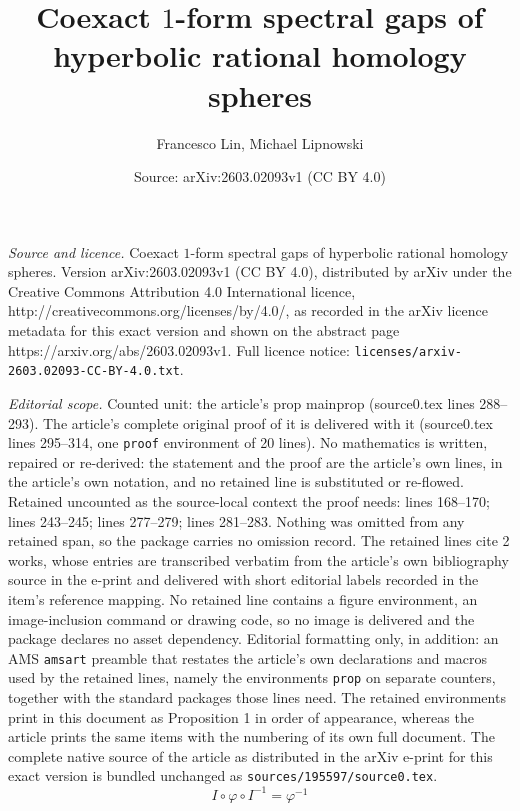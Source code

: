 \documentclass[10pt,a4paper]{amsart}
\title{Coexact $1$-form spectral gaps of hyperbolic rational homology spheres}
\author{Francesco Lin, Michael Lipnowski}
\date{Source: arXiv:2603.02093v1 (CC BY 4.0)}
\begin{document}
\maketitle

\noindent\emph{Source and licence.} Coexact $1$-form spectral gaps of hyperbolic rational homology spheres. Version arXiv:2603.02093v1 (CC BY 4.0), distributed by arXiv under the Creative Commons Attribution 4.0 International licence, http://creativecommons.org/licenses/by/4.0/, as recorded in the arXiv licence metadata for this exact version and shown on the abstract page https://arxiv.org/abs/2603.02093v1. Full licence notice: \texttt{licenses/arxiv-2603.02093-CC-BY-4.0.txt}.\par\smallskip

\noindent\textit{Editorial scope.} Counted unit: the article's prop mainprop (source0.tex lines 288--293). The article's complete original proof of it is delivered with it (source0.tex lines 295--314, one \texttt{proof} environment of 20 lines). No mathematics is written, repaired or re-derived: the statement and the proof are the article's own lines, in the article's own notation, and no retained line is substituted or re-flowed.  Retained uncounted as the source-local context the proof needs: lines 168--170; lines 243--245; lines 277--279; lines 281--283.  Nothing was omitted from any retained span, so the package carries no omission record.  The retained lines cite 2 works, whose entries are transcribed verbatim from the article's own bibliography source in the e-print and delivered with short editorial labels recorded in the item's reference mapping.  No retained line contains a figure environment, an image-inclusion command or drawing code, so no image is delivered and the package declares no asset dependency.  Editorial formatting only, in addition: an AMS \texttt{amsart} preamble that restates the article's own declarations and macros used by the retained lines, namely the environments \texttt{prop} on separate counters, together with the standard packages those lines need.  The retained environments print in this document as Proposition 1 in order of appearance, whereas the article prints the same items with the numbering of its own full document.  The complete native source of the article as distributed in the arXiv e-print for this exact version is bundled unchanged as \texttt{sources/195597/source0.tex}.
\begin{equation}\label{conj}
I\circ\varphi\circ I^{-1}=\varphi^{-1}
\end{equation}
\end{document}
